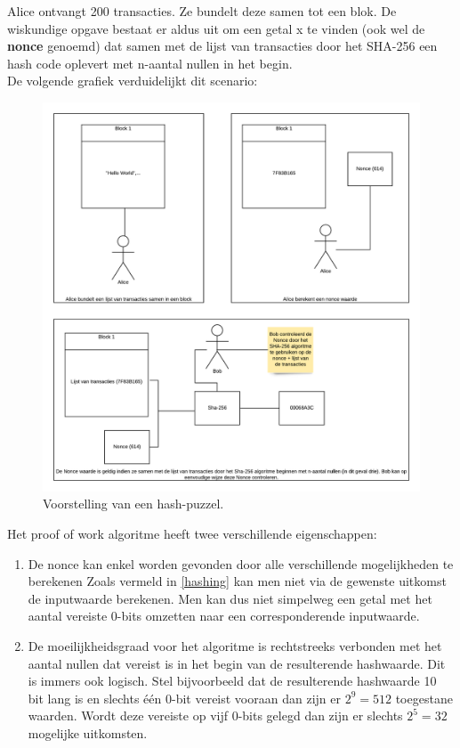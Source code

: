 Alice ontvangt 200 transacties. Ze bundelt deze samen tot een blok. De wiskundige opgave bestaat er aldus uit om een getal x te vinden (ook wel de \textbf{nonce} genoemd) dat samen met de lijst van transacties door het SHA-256 een hash code oplevert met n-aantal nullen in het begin.\\

De volgende grafiek verduidelijkt dit scenario:

\begin{figure}[h!]
	\centering
		\includegraphics[scale=0.3]{blockchain-3.png}
	\caption[Blockchain - Voorstelling 3]{Voorstelling van een hash-puzzel.}
\end{figure}

\newpage

Het proof of work algoritme heeft twee verschillende eigenschappen:

\begin{enumerate}
	\item De nonce kan enkel worden gevonden door alle verschillende mogelijkheden te berekenen Zoals vermeld in \ref{hashing} kan men niet via de gewenste uitkomst de inputwaarde berekenen. Men kan dus niet simpelweg een getal met het aantal vereiste 0-bits omzetten naar een corresponderende inputwaarde.
	\item De moeilijkheidsgraad voor het algoritme is rechtstreeks verbonden met het aantal nullen dat vereist is in het begin van de resulterende hashwaarde. Dit is immers ook logisch. Stel bijvoorbeeld dat de resulterende hashwaarde 10 bit lang is en slechts één 0-bit vereist vooraan dan zijn er $2^9 = 512$ toegestane waarden. Wordt deze vereiste op vijf 0-bits gelegd dan zijn er slechts $2^5 = 32$ mogelijke uitkomsten.
\end{enumerate}

